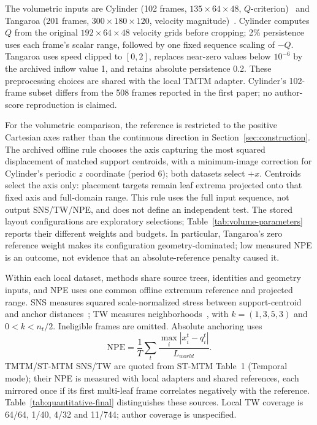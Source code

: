 \documentclass[review]{vgtc}
\begin{document}
The volumetric inputs are Cylinder (102 frames, $135\times64\times48$, $Q$-criterion)~\cite{Camarri:2005:Cylinder,Weinkauf:SquareCylinder} and Tangaroa (201 frames, $300\times180\times120$, velocity magnitude)~\cite{Popinet:2004:Tangaroa}. Cylinder computes $Q$ from the original $192\times64\times48$ velocity grids before cropping; 2\% persistence uses each frame's scalar range, followed by one fixed sequence scaling of $-Q$. Tangaroa uses speed clipped to $[0,2]$, replaces near-zero values below $10^{-6}$ by the archived inflow value 1, and retains absolute persistence 0.2. These preprocessing choices are shared with the local TMTM adapter. Cylinder's 102-frame subset differs from the 508 frames reported in the first paper; no author-score reproduction is claimed.

For the volumetric comparison, the reference is restricted to the positive Cartesian axes rather than the continuous direction in Section~\ref{sec:construction}. The archived offline rule chooses the axis capturing the most squared displacement of matched support centroids, with a minimum-image correction for Cylinder's periodic $z$ coordinate (period 6); both datasets select $+x$. Centroids select the axis only: placement targets remain leaf extrema projected onto that fixed axis and full-domain range. This rule uses the full input sequence, not output SNS/TW/NPE, and does not define an independent test. The stored layout configurations are exploratory selections; Table~\ref{tab:volume-parameters} reports their different weights and budgets. In particular, Tangaroa's zero reference weight makes its configuration geometry-dominated; low measured NPE is an outcome, not evidence that an absolute-reference penalty caused it.

Within each local dataset, methods share source trees, identities and geometry inputs, and NPE uses one common offline extremum reference and projected range. SNS measures squared scale-normalized stress between support-centroid and anchor distances~\cite{Smelser:2025:Scale,STMTM:2026}; TW measures neighborhoods~\cite{Venna:2001:NP}, with $k=(1,3,5,3)$ and $0<k<n_t/2$. Ineligible frames are omitted. Absolute anchoring uses
\begin{equation}\label{eq:experimental-npe}
\mathrm{NPE}=\frac{1}{T}\sum_t\frac{\max_i|x_i^t-q_i^t|}{L_{world}}.
\end{equation}
TMTM/ST-MTM SNS/TW are quoted from ST-MTM Table~1 (Temporal mode); their NPE is measured with local adapters and shared references, each mirrored once if its first multi-leaf frame correlates negatively with the reference. Table~\ref{tab:quantitative-final} distinguishes these sources. Local TW coverage is 64/64, 1/40, 4/32 and 11/744; author coverage is unspecified.
\end{document}
